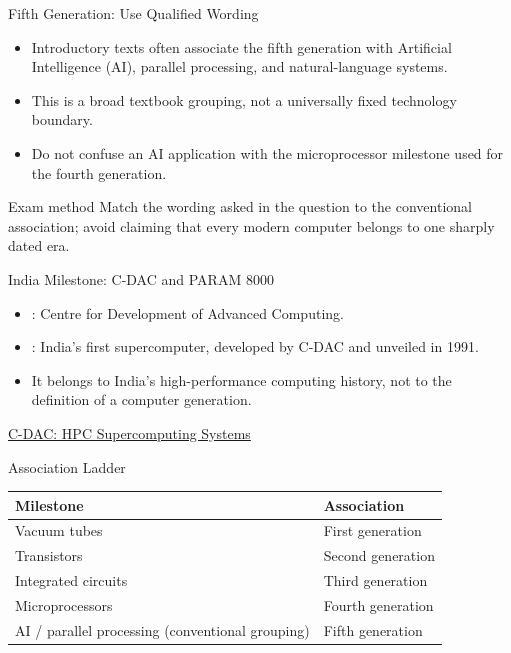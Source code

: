 \documentclass[aspectratio=169]{beamer}
\begin{document}
\begin{frame}{Fifth Generation: Use Qualified Wording}
  \begin{itemize}
    \item Introductory texts often associate the fifth generation with
      Artificial Intelligence (AI), parallel processing, and natural-language
      systems.
    \item This is a broad textbook grouping, not a universally fixed
      technology boundary.
    \item Do not confuse an AI application with the microprocessor milestone
      used for the fourth generation.
  \end{itemize}
  \begin{alertblock}{Exam method}
    Match the wording asked in the question to the conventional association;
    avoid claiming that every modern computer belongs to one sharply dated era.
  \end{alertblock}
\end{frame}

\begin{frame}{India Milestone: C-DAC and PARAM 8000}
  \begin{itemize}
    \item {}: Centre for Development of Advanced Computing.
    \item {}: India's first supercomputer, developed by C-DAC
      and unveiled in 1991.
    \item It belongs to India's high-performance computing history, not to
      the definition of a computer generation.
  \end{itemize}
  \vspace{0.3cm}
  \href{https://cdac.in/index.aspx?id=hpc_ss_supercomputing_systems}
       {C-DAC: HPC Supercomputing Systems}
\end{frame}

\begin{frame}{Association Ladder}
  \begin{center}
    \begin{tabular}{ll}
      \toprule
      \textbf{Milestone} & \textbf{Association} \\
      \midrule
      Vacuum tubes & First generation \\
      Transistors & Second generation \\
      Integrated circuits & Third generation \\
      Microprocessors & Fourth generation \\
      AI / parallel processing (conventional grouping) & Fifth generation \\
      \bottomrule
    \end{tabular}
  \end{center}
  \vspace{0.3cm}
\end{frame}
\end{document}
